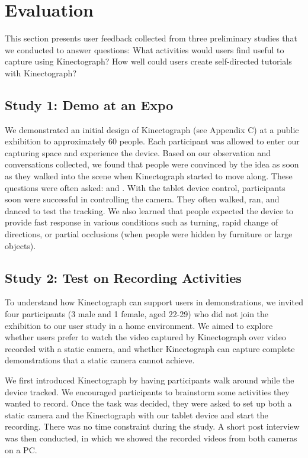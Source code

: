\section{Evaluation}
\label{kinectograph_study}

This section presents user feedback collected from three preliminary studies that we conducted to answer questions: What activities would users find useful to capture using Kinectograph? How well could users create self-directed tutorials with Kinectograph?

\subsection{Study 1: Demo at an Expo}
We demonstrated an initial design of Kinectograph (see Appendix C) at a public exhibition to approximately 60 people. Each participant was allowed to enter our capturing space and experience the device. Based on our observation and conversations collected, we found that people were convinced by the idea as soon as they walked into the scene when Kinectograph started to move along. These questions were often asked:  and . With the tablet device control, participants soon were successful in controlling the camera. They often walked, ran, and danced to test the tracking. We also learned that people expected the device to provide fast response in various conditions such as turning, rapid change of directions, or partial occlusions (when people were hidden by furniture or large objects).

\subsection{Study 2: Test on Recording Activities}
To understand how Kinectograph can support users in demonstrations, we invited four participants (3 male and 1 female, aged 22-29) who did not join the exhibition to our user study in a home environment. We aimed to explore whether users prefer to watch the video captured by Kinectograph over video recorded with a static camera, and whether Kinectograph can capture complete demonstrations
 that a static camera cannot achieve.

We first introduced Kinectograph by having participants walk around while the device tracked. We encouraged participants to brainstorm some activities they wanted to record. Once the task was decided, they were asked to set up both a static camera and the Kinectograph with our tablet device and start the recording. There was no time constraint during the study. A short post interview was then conducted, in which we showed the recorded videos from both cameras on a PC.

